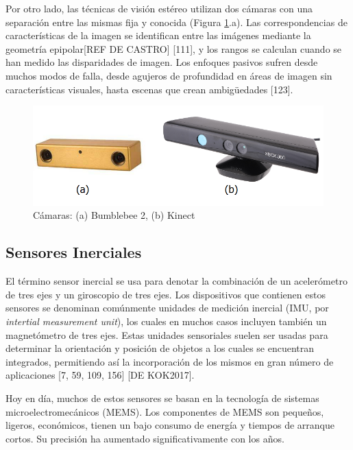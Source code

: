 Por otro lado, las técnicas de visión estéreo utilizan dos cámaras con una separación entre las mismas fija y conocida (Figura \ref{fig:camaras}.a). Las correspondencias de características de la imagen se identifican entre las imágenes mediante la geometría epipolar[REF DE CASTRO] [111], y los rangos se calculan cuando se han medido las disparidades de imagen. Los enfoques pasivos sufren desde muchos modos de falla, desde agujeros de profundidad en áreas de imagen sin características visuales, hasta escenas que crean ambigüedades [123].

\begin{figure}
    \centering
    \includegraphics[width=.9\textwidth]{Img/bumblekinect}
    \caption{Cámaras: (a) Bumblebee 2, (b) Kinect}
    \label{fig:camaras}
\end{figure}

\subsection{Sensores Inerciales}
El término sensor inercial se usa para denotar la combinación de un acelerómetro de tres ejes y un giroscopio de tres ejes. Los dispositivos que contienen estos sensores se denominan comúnmente unidades de medición inercial (IMU, por \textit{intertial measurement unit}), los cuales en muchos casos incluyen también un magnetómetro de tres ejes. Estas unidades sensoriales suelen ser usadas para determinar la orientación y posición de objetos a los cuales se encuentran integrados, permitiendo así la incorporación de los mismos en gran número de aplicaciones [7, 59, 109, 156] [DE KOK2017].

Hoy en día, muchos de estos sensores se basan en la tecnología de sistemas microelectromecánicos (MEMS). Los componentes de MEMS son pequeños, ligeros, económicos, tienen un bajo consumo de energía y tiempos de arranque cortos. Su precisión ha aumentado significativamente con los años.

